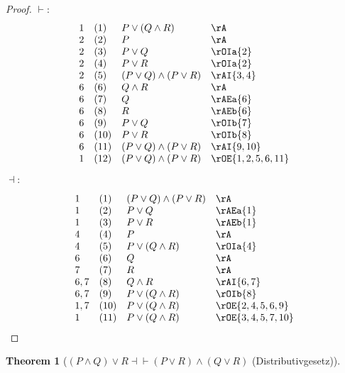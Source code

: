 \documentclass{book}
\theoremstyle{plain}
\newtheorem{theorem}{Theorem}
\theoremstyle{remark}
\theoremstyle{definition}
\begin{document}
\begin{proof}
	\(\vdash:\)
	\[
	\begin{array}{llll}
		1 & (1) & P \lor (Q \land R) & \rA \\
		2 & (2) & P & \rA \\
		2 & (3) & P \lor Q & \rOIa{2} \\
		2 & (4) & P \lor R & \rOIa{2} \\
		2 & (5) & (P \lor Q) \land (P \lor R) & \rAI{3,4} \\
		6 & (6) & Q \land R & \rA \\
		6 & (7) & Q & \rAEa{6} \\
		6 & (8) & R & \rAEb{6} \\
		6 & (9) & P \lor Q & \rOIb{7} \\
		6 & (10) & P \lor R & \rOIb{8} \\
		6 & (11) & (P \lor Q) \land (P \lor R) & \rAI{9,10} \\
		1 & (12) & (P \lor Q) \land (P \lor R) & \rOE{1,2,5,6,11} \\
	\end{array}
	\]
	
	\(\dashv:\)
	
	\[
	\begin{array}{llll}
		1 & (1) & (P \lor Q) \land (P \lor R) & \rA \\
		1 & (2) & P \lor Q & \rAEa{1} \\
		1 & (3) & P \lor R & \rAEb{1} \\
		4 & (4) & P & \rA \\
		4 & (5) & P \lor (Q \land R) & \rOIa{4} \\
		6 & (6) & Q & \rA \\
		7 & (7) & R & \rA \\
		6,7 & (8) & Q \land R & \rAI{6,7} \\
		6,7 & (9) & P \lor (Q \land R) & \rOIb{8} \\
		1,7 & (10) & P \lor (Q \land R) & \rOE{2,4,5,6,9} \\
		1 & (11) & P \lor (Q \land R) & \rOE{3,4,5,7,10} \\
	\end{array}
	\]
\end{proof}

\label{LpPAndQRpOrREqvLpPOrRRpAndLpQOrRRp}
\begin{theorem}[\((P\land Q)\lor R \dashv \vdash  (P \lor R) \land (Q\lor R)\) (Distributivgesetz)]
\end{theorem}
\end{document}
